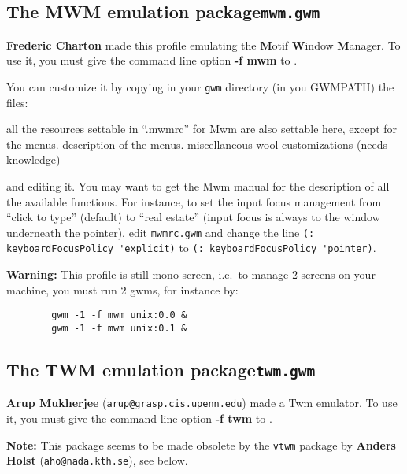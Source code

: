 \subsection{The MWM emulation package\hfill{\tt mwm.gwm}}

\centerline{}

{\bf Frederic Charton} made this profile emulating the {\bf M}otif
{\bf W}indow {\bf M}anager. To use it, you must give the command line 
option {\bf -f mwm} to {\GWM}.

You can customize it by copying in your
\verb"gwm" directory (in you GWMPATH) the files:

\begin{description}
 all the resources settable in ``.mwmrc'' for {\sc Mwm}
are also settable here, except for the menus.
 description of the menus.
 miscellaneous wool customizations (needs {\WOOL}
knowledge)
\end{description}

and editing it. You may want to get the {\sc Mwm} manual for the description
of all the available functions. For instance, to set the input focus management
from ``click to type'' (default) to ``real estate'' (input focus is always
to the window underneath the pointer), edit \verb"mwmrc.gwm" and change
the line \verb"(: keyboardFocusPolicy 'explicit)" to 
\verb"(: keyboardFocusPolicy 'pointer)".

{\bf Warning:} This profile is still mono-screen, i.e.\ to manage 2 screens
on your machine, you must run 2 gwms, for instance by:
{\exemplefont\begin{verbatim}
        gwm -1 -f mwm unix:0.0 &
        gwm -1 -f mwm unix:0.1 &
\end{verbatim}}

\subsection{The TWM emulation package\hfill{\tt twm.gwm}}

\centerline{}

{\bf Arup Mukherjee} (\verb"arup@grasp.cis.upenn.edu") made a {\sc
Twm} emulator. To use it, you must give the command line 
option {\bf -f twm} to {\GWM}.

{\bf Note:} This package seems to be made obsolete by the {\tt vtwm} package
by {\bf Anders Holst} (\verb"aho@nada.kth.se"), see below.

